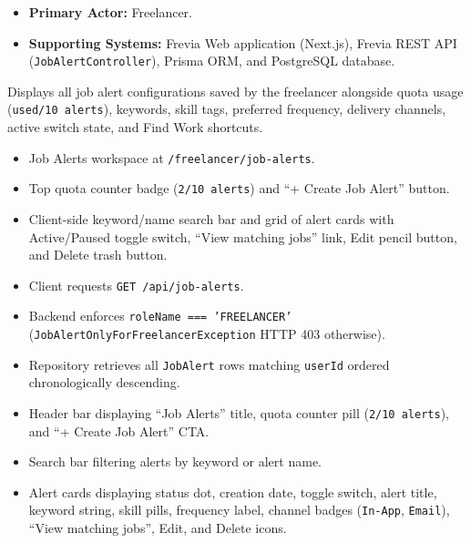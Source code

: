 
\begin{itemize}[leftmargin=1.6em,topsep=3pt,itemsep=2pt,parsep=0pt,label=$\bullet$]
    \item \textbf{Primary Actor:} Freelancer.
    \item \textbf{Supporting Systems:} Frevia Web application (Next.js), Frevia REST API (\texttt{JobAlertController}), Prisma ORM, and PostgreSQL database.
\end{itemize}

\noindent Displays all job alert configurations saved by the freelancer alongside quota usage (\texttt{used/10 alerts}), keywords, skill tags, preferred frequency, delivery channels, active switch state, and Find Work shortcuts.

\begin{itemize}[leftmargin=1.6em,topsep=3pt,itemsep=2pt,parsep=0pt,label=$\bullet$]
    \item Job Alerts workspace at \texttt{/freelancer/job-alerts}.
    \item Top quota counter badge (\texttt{2/10 alerts}) and ``+ Create Job Alert'' button.
    \item Client-side keyword/name search bar and grid of alert cards with Active/Paused toggle switch, ``View matching jobs'' link, Edit pencil button, and Delete trash button.
\end{itemize}

\begin{itemize}[leftmargin=1.6em,topsep=3pt,itemsep=2pt,parsep=0pt,label=$\bullet$]
    \item Client requests \texttt{GET /api/job-alerts}.
    \item {\sloppy Backend enforces \texttt{roleName === 'FREELANCER'} (\texttt{JobAlert\allowbreak{}OnlyFor\allowbreak{}Freelancer\allowbreak{}Exception} HTTP 403 otherwise).\par}
    \item Repository retrieves all \texttt{JobAlert} rows matching \texttt{userId} ordered chronologically descending.
\end{itemize}

\begin{itemize}[leftmargin=1.6em,topsep=3pt,itemsep=2pt,parsep=0pt,label=$\bullet$]
    \item Header bar displaying ``Job Alerts'' title, quota counter pill (\texttt{2/10 alerts}), and ``+ Create Job Alert'' CTA.
    \item Search bar filtering alerts by keyword or alert name.
    \item Alert cards displaying status dot, creation date, toggle switch, alert title, keyword string, skill pills, frequency label, channel badges (\texttt{In-App}, \texttt{Email}), ``View matching jobs'', Edit, and Delete icons.
\end{itemize}

